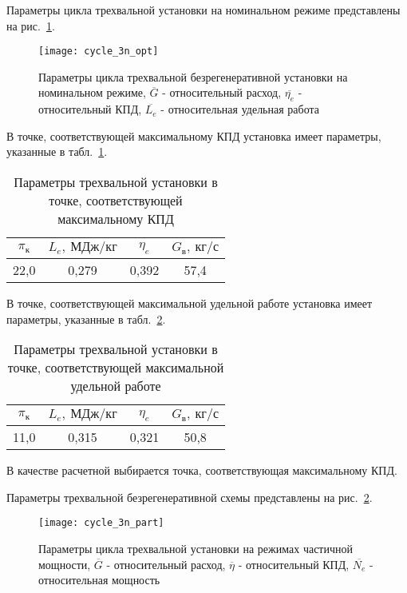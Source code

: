 Параметры цикла трехвальной установки на номинальном режиме представлены на рис.~\ref{img:cycle_3n_opt}.

\begin{figure}[H]
    \centering
    \texttt{[image: cycle\_3n\_opt]}
    \caption{Параметры цикла трехвальной безрегенеративной установки на номинальном режиме,
	$\overline{G}$ - относительный расход, $\overline{\eta_e}$ - относительный КПД, $\overline{L_e}$ - относительная удельная работа}
    \label{img:cycle_3n_opt}
\end{figure}

В точке, соответствующей максимальному КПД установка имеет параметры, указанные в табл.~\ref{tab:cycle_3n_max_eta}.

\begin{longtable}{|c|c|c|c|}
	\caption{Параметры трехвальной установки в точке, соответствующей максимальному КПД} 
	\label{tab:cycle_3n_max_eta}
	\hline
	\textbf{$\pi_к$} & \textbf{$L_e, \ МДж/кг$} & \textbf{$\eta_e$} & \textbf{$G_в, \ кг/с$} \\ \hline
	22,0 & 0,279 & 0,392 & 57,4 \\ \hline
\end{longtable}


В точке, соответствующей максимальной удельной работе установка имеет параметры, указанные в табл.~\ref{tab:cycle_3n_max_labour}.
\begin{longtable}{|c|c|c|c|}
	\caption{Параметры трехвальной установки в точке, соответствующей максимальной удельной работе} 
	\label{tab:cycle_3n_max_labour}
	\hline
	\textbf{$\pi_к$} & \textbf{$L_e, \ МДж/кг$} & \textbf{$\eta_e$} & \textbf{$G_в, \ кг/с$} \\ \hline
	11,0 & 0,315 & 0,321 & 50,8 \\ \hline
\end{longtable}

В качестве расчетной выбирается точка, соответствующая максимальному КПД.

Параметры трехвальной безрегенеративной схемы представлены на рис.~\ref{img:cycle_3n_part}.

\begin{figure}[H]
    \centering
    \texttt{[image: cycle\_3n\_part]}
    \caption{Параметры цикла трехвальной установки на режимах частичной мощности,
	$\overline{G}$ - относительный расход, $\overline{\eta}$ - относительный КПД, $\overline{N_e}$ - относительная мощность}
    \label{img:cycle_3n_part}
\end{figure}

